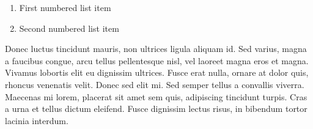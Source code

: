 \documentclass[a4paper, 11pt]{article} %
\begin{document}
\begin{enumerate}
\item First numbered list item
\item Second numbered list item
\end{enumerate}

Donec luctus tincidunt mauris, non ultrices ligula aliquam id. Sed varius, magna a faucibus congue, arcu tellus pellentesque nisl, vel laoreet magna eros et magna. Vivamus lobortis elit eu dignissim ultrices. Fusce erat nulla, ornare at dolor quis, rhoncus venenatis velit. Donec sed elit mi. Sed semper tellus a convallis viverra. Maecenas mi lorem, placerat sit amet sem quis, adipiscing tincidunt turpis. Cras a urna et tellus dictum eleifend. Fusce dignissim lectus risus, in bibendum tortor lacinia interdum.






\end{document}
